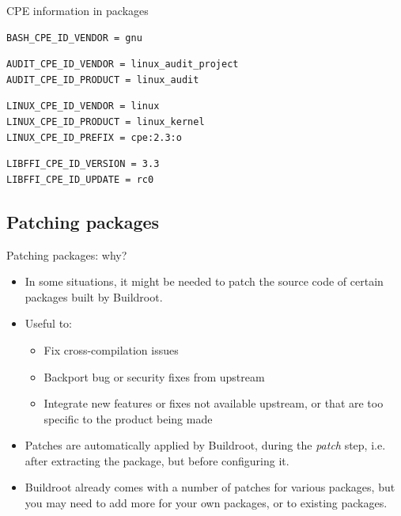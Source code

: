 \begin{frame}[fragile]{CPE information in packages}

  \begin{block}{}
\begin{verbatim}
BASH_CPE_ID_VENDOR = gnu
\end{verbatim}
  \end{block}

  \begin{block}{}
\begin{verbatim}
AUDIT_CPE_ID_VENDOR = linux_audit_project
AUDIT_CPE_ID_PRODUCT = linux_audit
\end{verbatim}
  \end{block}

  \begin{block}{}
\begin{verbatim}
LINUX_CPE_ID_VENDOR = linux
LINUX_CPE_ID_PRODUCT = linux_kernel
LINUX_CPE_ID_PREFIX = cpe:2.3:o
\end{verbatim}
  \end{block}

  \begin{block}{}
\begin{verbatim}
LIBFFI_CPE_ID_VERSION = 3.3
LIBFFI_CPE_ID_UPDATE = rc0
\end{verbatim}
  \end{block}

\end{frame}

\subsection{Patching packages}

\begin{frame}{Patching packages: why?}
  \begin{itemize}
  \item In some situations, it might be needed to patch the source
    code of certain packages built by Buildroot.
  \item Useful to:
    \begin{itemize}
    \item Fix cross-compilation issues
    \item Backport bug or security fixes from upstream
    \item Integrate new features or fixes not available upstream, or
      that are too specific to the product being made
    \end{itemize}
  \item Patches are automatically applied by Buildroot, during the
    {\em patch} step, i.e. after extracting the package, but before
    configuring it.
  \item Buildroot already comes with a number of patches for various
    packages, but you may need to add more for your own packages, or
    to existing packages.
  \end{itemize}
\end{frame}


